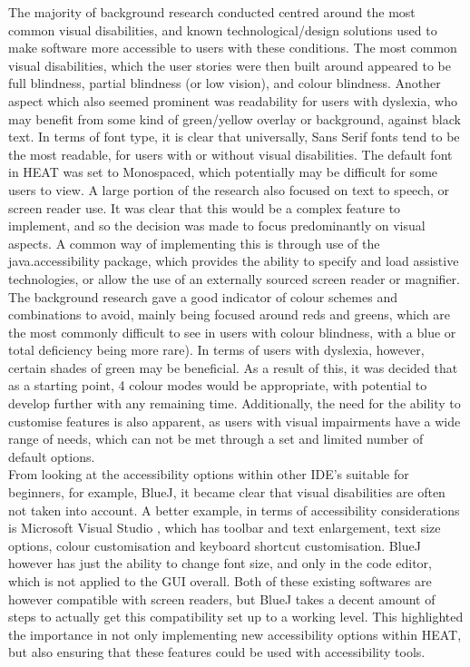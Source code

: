 The majority of background research conducted centred around the most common visual disabilities, and known technological/design solutions used to make software more accessible to users with these conditions. The most common visual disabilities, which the user stories were then built around appeared to be full blindness, partial blindness (or low vision\cite{IEEEexample:LowVision}), and colour blindness. Another aspect which also seemed prominent was readability for users with dyslexia, who may benefit from some kind of green/yellow overlay or background, against black text\cite{IEEEexample:DyslexiaReadability}. In terms of font type, it is clear that universally, Sans Serif fonts tend to be the most readable, for users with or without visual disabilities. The default font in HEAT was set to Monospaced, which potentially may be difficult for some users to view. A large portion of the research also focused on text to speech, or screen reader use.\cite{IEEEexample:JavaBridge} It was clear that this would be a complex feature to implement, and so the decision was made to focus predominantly on visual aspects. A common way of implementing this is through use of the java.accessibility package, which provides the ability to specify and load assistive technologies, or allow the use of an externally sourced screen reader or magnifier. \\

The background research gave a good indicator of colour schemes and combinations to avoid, mainly being focused around reds and greens, which are the most commonly difficult to see in users with colour blindness,\cite{IEEEexample:ColourBlindness} with a blue or total deficiency being more rare). In terms of users with dyslexia, however, certain shades of green may be beneficial. As a result of this, it was decided that as a starting point, 4 colour modes would be appropriate, with potential to develop further with any remaining time. Additionally, the need for the ability to customise features is also apparent, as users with visual impairments have a wide range of needs, which can not be met through a set and limited number of default options. \\

From looking at the accessibility options within other IDE’s suitable for beginners, for example, BlueJ, it became clear that visual disabilities are often not taken into account. A better example, in terms of accessibility considerations is Microsoft Visual Studio \cite{IEEEexample:VisualStudio}, which has toolbar and text enlargement, text size options, colour customisation and keyboard shortcut customisation. BlueJ however has just the ability to change font size, and only in the code editor, which is not applied to the GUI overall. Both of these existing softwares are however compatible with screen readers, but BlueJ takes a decent amount of steps to actually get this compatibility set up to a working level. This highlighted the importance in not only implementing new accessibility options within HEAT, but also ensuring that these features could be used with accessibility tools. 
